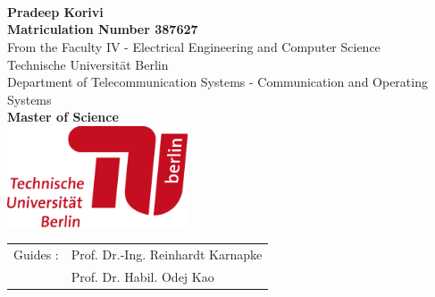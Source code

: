 \begin{titlepage}
\begin{center}
\vspace*{2.0cm}
 \\
\vspace*{0.2cm}
 \\
\vspace*{0.2cm}
 \\
\vspace*{0.5cm}
\noindent \large {\bf Pradeep Korivi} \\
\vspace*{0.2cm}
\noindent \large {\bf Matriculation Number 387627} \\
\vspace*{0.2cm}
\noindent \large {From the Faculty IV - Electrical Engineering and Computer Science} \\
\vspace*{0.2cm}
\noindent \large {Technische Universit{\"a}t Berlin} \\
\vspace*{0.2cm}
\noindent \large {Department of Telecommunication Systems - Communication and Operating Systems} \\
\vspace*{0.2cm}
\noindent \large {\bf Master of Science} \\
\vspace*{0.2cm}
\vspace{2cm}
{\includegraphics[width=0.4\textwidth]{Images/university.png}}
\vspace*{2cm}
~\\
\begin{tabular}{ll}
	\noindent \large{ Guides :}	& \noindent \large{Prof. Dr.-Ing. Reinhardt Karnapke}\\
      \vspace*{0.1cm}
    \noindent \large{}	& \noindent \large{Prof. Dr. Habil. Odej Kao}\\
     
	
\end{tabular}

\vspace*{1.5cm}

\end{center}
\end{titlepage}
\sloppy

\titlepage
